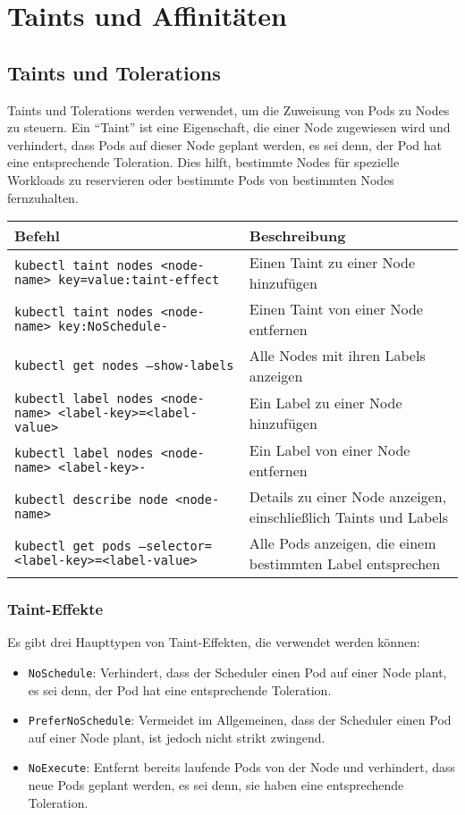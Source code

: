 \chapter{Taints und Affinitäten}

\section{Taints und Tolerations}
Taints und Tolerations werden verwendet, um die Zuweisung von Pods zu Nodes zu steuern. Ein \enquote{Taint} ist eine Eigenschaft, die einer Node zugewiesen wird und verhindert, dass Pods auf dieser Node geplant werden, es sei denn, der Pod hat eine entsprechende Toleration. Dies hilft, bestimmte Nodes für spezielle Workloads zu reservieren oder bestimmte Pods von bestimmten Nodes fernzuhalten.\\

\noindent
\begin{tabular}{|p{}|p{}|}
\hline
\textbf{Befehl} & \textbf{Beschreibung} \\
\hline
\texttt{kubectl taint nodes <node-name> key=value:taint-effect} & Einen Taint zu einer Node hinzufügen \\
\texttt{kubectl taint nodes <node-name> key:NoSchedule-} & Einen Taint von einer Node entfernen \\
\texttt{kubectl get nodes --show-labels} & Alle Nodes mit ihren Labels anzeigen \\
\texttt{kubectl label nodes <node-name> <label-key>=<label-value>} & Ein Label zu einer Node hinzufügen \\
\texttt{kubectl label nodes <node-name> <label-key>-} & Ein Label von einer Node entfernen \\
\texttt{kubectl describe node <node-name>} & Details zu einer Node anzeigen, einschließlich Taints und Labels \\
\texttt{kubectl get pods --selector=<label-key>=<label-value>} & Alle Pods anzeigen, die einem bestimmten Label entsprechen \\
\hline
\end{tabular}

\subsection{Taint-Effekte}
Es gibt drei Haupttypen von Taint-Effekten, die verwendet werden können:
\begin{itemize}
    \item \texttt{NoSchedule}: Verhindert, dass der Scheduler einen Pod auf einer Node plant, es sei denn, der Pod hat eine entsprechende Toleration.
    \item \texttt{PreferNoSchedule}: Vermeidet im Allgemeinen, dass der Scheduler einen Pod auf einer Node plant, ist jedoch nicht strikt zwingend.
    \item \texttt{NoExecute}: Entfernt bereits laufende Pods von der Node und verhindert, dass neue Pods geplant werden, es sei denn, sie haben eine entsprechende Toleration.
\end{itemize}


